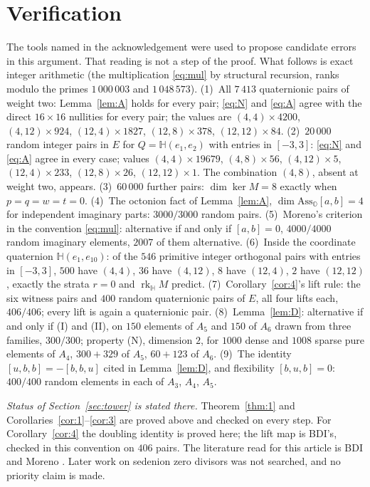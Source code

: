 \documentclass{baustms}
\theoremstyle{cupthm}
\numberwithin{equation}{section}
\newcommand{\Ass}{\mathrm{Ass}}
\newcommand{\HH}{\mathbb{H}}
\newcommand{\OO}{\mathbb{O}}
\newcommand{\rk}{\operatorname{rk}}
\begin{document}
\section{Verification}

The tools named in the acknowledgement were used to propose candidate errors in this argument. That reading is not a step of the proof. What follows is exact integer arithmetic (the multiplication \eqref{eq:mul} by structural recursion, ranks modulo the primes $1\,000\,003$ and $1\,048\,573$).
(1)~All $7\,413$ quaternionic pairs of weight two: Lemma~\ref{lem:A} holds for every pair; \eqref{eq:N} and \eqref{eq:A} agree with the direct $16\times 16$ nullities for every pair; the values are $(4,4)\times 4200$, $(4,12)\times 924$, $(12,4)\times 1827$, $(12,8)\times 378$, $(12,12)\times 84$.
(2)~$20\,000$ random integer pairs in $E$ for $Q=\HH(e_1,e_2)$ with entries in $[-3,3]$: \eqref{eq:N} and \eqref{eq:A} agree in every case; values $(4,4)\times 19679$, $(4,8)\times 56$, $(4,12)\times 5$, $(12,4)\times 233$, $(12,8)\times 26$, $(12,12)\times 1$. The combination $(4,8)$, absent at weight two, appears.
(3)~$60\,000$ further pairs: $\dim\ker M=8$ exactly when $p=q=w=t=0$.
(4)~The octonion fact of Lemma~\ref{lem:A}, $\dim\Ass_{\OO}[a,b]=4$ for independent imaginary parts: $3000/3000$ random pairs.
(5)~Moreno's criterion in the convention \eqref{eq:mul}: alternative if and only if $[a,b]=0$, $4000/4000$ random imaginary elements, $2007$ of them alternative.
(6)~Inside the coordinate quaternion $\HH(e_1,e_{10})$: of the $546$ primitive integer orthogonal pairs with entries in $[-3,3]$, $500$ have $(4,4)$, $36$ have $(4,12)$, $8$ have $(12,4)$, $2$ have $(12,12)$, exactly the strata $r=0$ and $\rk_{\HH} M$ predict.
(7)~Corollary~\ref{cor:4}'s lift rule: the six witness pairs and $400$ random quaternionic pairs of $E$, all four lifts each, $406/406$; every lift is again a quaternionic pair.
(8)~Lemma~\ref{lem:D}: alternative if and only if (I) and (II), on $150$ elements of $A_5$ and $150$ of $A_6$ drawn from three families, $300/300$; property (N), dimension $2$, for $1000$ dense and $1008$ sparse pure elements of $A_4$, $300+329$ of $A_5$, $60+123$ of $A_6$.
(9)~The identity $[u,b,b]=-[b,b,u]$ cited in Lemma~\ref{lem:D}, and flexibility $[b,u,b]=0$: $400/400$ random elements in each of $A_3$, $A_4$, $A_5$.

\noindent\textit{Status of Section~\ref{sec:tower} is stated there.}
Theorem~\ref{thm:1} and Corollaries~\ref{cor:1}--\ref{cor:3} are proved above and checked on every step. For Corollary~\ref{cor:4} the doubling identity is proved here; the lift map is BDI's, checked in this convention on $406$ pairs. The literature read for this article is BDI \cite{bdi} and Moreno \cite{moreno}. Later work on sedenion zero divisors was not searched, and no priority claim is made.
\end{document}
